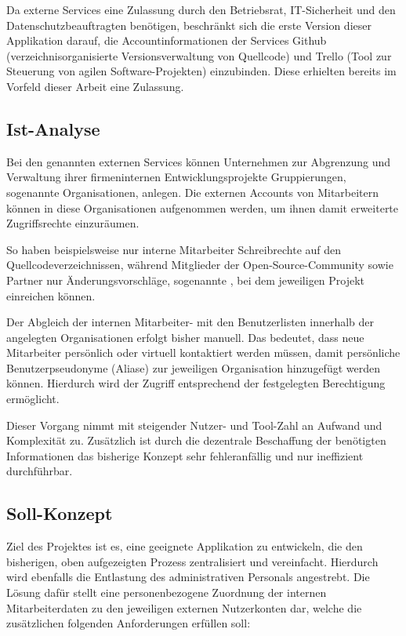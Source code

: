 Da externe Services eine Zulassung durch den Betriebsrat, IT-Sicherheit und den Datenschutzbeauftragten
benötigen, beschränkt sich die erste Version dieser Applikation darauf, die Accountinformationen der
Services Github (verzeichnisorganisierte Versionsverwaltung von Quellcode) und Trello
(Tool zur Steuerung von agilen Software-Projekten) einzubinden. Diese erhielten bereits im Vorfeld
dieser Arbeit eine Zulassung.

\subsection{Ist-Analyse}
\label{sec:Ist-Analyse}
Bei den genannten externen Services können Unternehmen zur Abgrenzung und
Verwaltung ihrer firmeninternen Entwicklungsprojekte Gruppierungen, sogenannte Organisationen, anlegen.
Die externen Accounts von Mitarbeitern können in diese Organisationen aufgenommen werden,
um ihnen damit erweiterte Zugriffsrechte einzuräumen.

So haben beispielsweise nur interne Mitarbeiter Schreibrechte auf den Quellcodeverzeichnissen, während
Mitglieder der Open-Source-Community sowie Partner nur Änderungsvorschläge, sogenannte
, bei dem jeweiligen Projekt einreichen können.

Der Abgleich der internen Mitarbeiter- mit den Benutzerlisten innerhalb der angelegten Organisationen
erfolgt bisher manuell. Das bedeutet, dass neue Mitarbeiter persönlich oder virtuell
kontaktiert werden müssen, damit persönliche Benutzerpseudonyme (Aliase) zur jeweiligen Organisation hinzugefügt
werden können. Hierdurch wird der Zugriff entsprechend der festgelegten Berechtigung ermöglicht.

Dieser Vorgang nimmt mit steigender Nutzer- und Tool-Zahl an Aufwand und Komplexität zu.
Zusätzlich ist durch die dezentrale Beschaffung der benötigten Informationen das bisherige
Konzept sehr fehleranfällig und nur ineffizient durchführbar.

\subsection{Soll-Konzept}
\label{sec:Soll-Konzept}
Ziel des Projektes ist es, eine geeignete Applikation zu entwickeln, die den bisherigen, oben
aufgezeigten Prozess zentralisiert und vereinfacht. Hierdurch wird ebenfalls die Entlastung des
administrativen Personals angestrebt. Die Lösung dafür stellt eine personenbezogene Zuordnung der
internen Mitarbeiterdaten zu den jeweiligen externen Nutzerkonten dar, welche die zusätzlichen folgenden
Anforderungen erfüllen soll:

